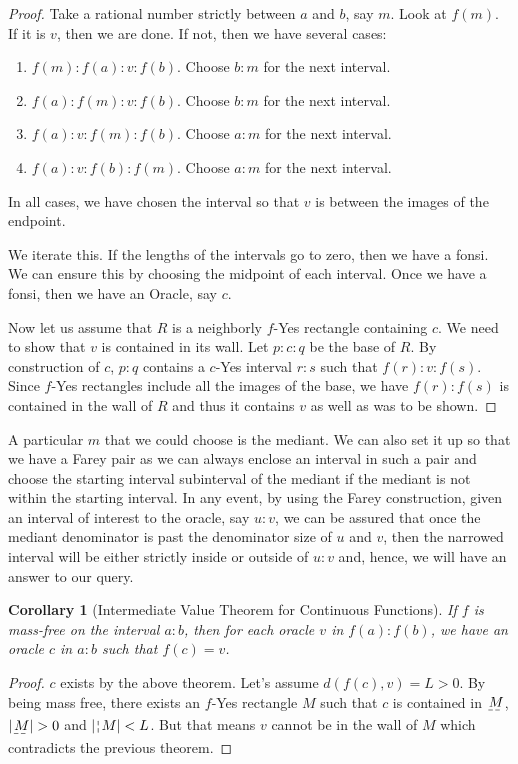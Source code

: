\documentclass[12pt]{article}
\newtheorem{corollary}{Corollary}[section]
\begin{document}
\begin{proof}
Take a rational number strictly between $a$ and $b$, say $m$. Look at $f(m)$. If it is $v$, then we are done. If not, then we have several cases: 
\begin{enumerate}
\item $f(m):f(a):v:f(b)$. Choose $b:m$ for the next interval.
\item $f(a):f(m):v:f(b)$. Choose $b:m$ for the next interval. 
\item $f(a):v:f(m):f(b)$. Choose $a:m$ for the next interval.
\item $f(a):v:f(b):f(m)$. Choose $a:m$ for the next interval. 
\end{enumerate}
In all cases, we have chosen the interval so that $v$ is between the images of the endpoint. 

We iterate this. If the lengths of the intervals go to zero, then we have a fonsi. We can ensure this by choosing the midpoint of each interval. Once we have a fonsi, then we have an Oracle, say $c$. 

Now let us assume that $R$ is a neighborly $f$-Yes rectangle containing $c$. We need to show that $v$ is contained in its wall. Let $p:c:q$ be the base of $R$. By construction of $c$, $p:q$ contains a $c$-Yes interval $r:s$ such that $f(r):v:f(s)$. Since $f$-Yes rectangles include all the images of the base, we have $f(r):f(s)$ is contained in the wall of $R$ and thus it contains $v$ as well as was to be shown. 
\end{proof}

A particular $m$ that we could choose is the mediant. We can also set it up so that we have a Farey pair as we can always enclose an interval in such a pair and choose the starting interval subinterval of the mediant if the mediant is not within the starting interval. In any event, by using the Farey construction, given an interval of interest to the oracle, say $u:v$, we can be assured that once the mediant denominator is past the denominator size of $u$ and $v$, then the narrowed interval will be either strictly inside or outside of $u:v$ and, hence, we will have an answer to our query. 

\begin{corollary}[Intermediate Value Theorem for Continuous Functions]
If $f$ is mass-free on the interval $a:b$, then for each oracle $v$ in $f(a):f(b)$, we have an oracle $c$ in $a:b$ such that $f(c)=v$.
\end{corollary}

\begin{proof}
$c$ exists by the above theorem. Let's assume $d(f(c), v) = L > 0$. By being mass free, there exists an $f$-Yes rectangle $M$ such that $c$ is contained in $\base{M}$, $|\base{M}| > 0$ and $|\wall{M}| < L$. But that means $v$ cannot be in the wall of $M$ which contradicts the previous theorem. 
\end{proof}
    
\end{document}
